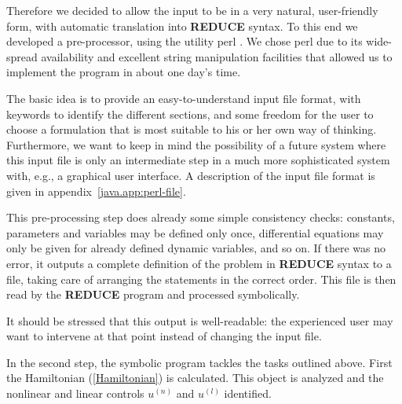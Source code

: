 \documentclass[12pt,a4paper]{article}
\newcommand{\REDUCE}{{\sf\bf REDUCE}}
\newcommand{\perl}{{\sf perl}}
\begin{document}
Therefore we decided to allow the input to be in a very natural,
user-friendly form, with automatic translation into \REDUCE{} syntax.
To this end we developed a pre-processor, using the utility \perl{}
\cite{perl}. We chose \perl{} due to its wide-spread availability and
excellent string manipulation facilities that allowed us to implement
the program in about one day's time.

The basic idea is to provide an easy-to-understand input file format,
with keywords to identify the different sections, and some freedom for
the user to choose a formulation that is most suitable to his or her
own way of thinking. Furthermore, we want to keep in mind the
possibility of a future system where this input file is only an
intermediate step in a much more sophisticated system with, e.g., a
graphical user interface. A description of the input file format is
given in appendix~\ref{java.app:perl-file}.

This pre-processing step does already some simple consistency checks:
constants, parameters and variables may be defined only once,
differential equations may only be given for already defined dynamic
variables, and so on. If there was no error, it outputs a complete
definition of the problem in \REDUCE{} syntax to a file, taking care
of arranging the statements in the correct order.  This file is
then read by the \REDUCE{} program and processed symbolically.

It should be stressed that this output is well-readable: the
experienced user may want to intervene at that point instead of
changing the input file.

In the second step, the symbolic program tackles the tasks outlined
above.  First the Hamiltonian (\ref{Hamiltonian}) is calculated. This
object is analyzed and the nonlinear and linear controls $u^{(n)}$ and
$u^{(l)}$ identified. 
\end{document}
